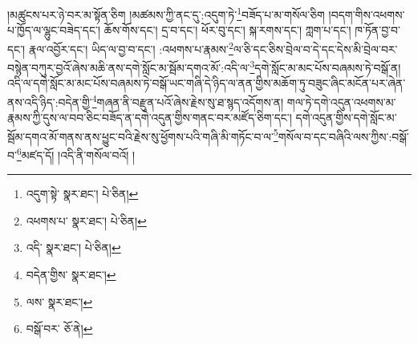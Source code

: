 །མཚུངས་པར་ཉེ་བར་མ་སྟོན་ཅིག །མཚམས་ཀྱི་ནང་དུ་:འདུག་ཏེ་\footnote{འདུག་སྟེ་  སྣར་ཐང་།  པེ་ཅིན། }བཟོད་པ་མ་གསོལ་ཅིག །བདག་གིས་འཕགས་པ་ཁྱོད་ལ་ལྷུང་བཟེད་དང་། ཆོས་གོས་དང་། དྲ་བ་དང་། ཕོར་བུ་དང་། སྐ་རགས་དང་། ཀླག་པ་དང་། ཁ་ཏོན་བྱ་བ་དང་། རྣལ་འབྱོར་དང་། ཡིད་ལ་བྱ་བ་དང་། :འཕགས་པ་རྣམས་\footnote{འཕགས་པ་  སྣར་ཐང་།  པེ་ཅིན། }ལ་ཅི་དང་ཅིས་བྲེལ་བ་དེ་དང་དེས་མི་བྲེལ་བར་བསྙེན་བཀུར་བྱའོ་ཞེས་མཆི་ནས་དགེ་སློང་མ་སྦོམ་དགའ་མོ་:འདི་ལ་\footnote{འདི་  སྣར་ཐང་།  པེ་ཅིན། }དགེ་སློང་མ་མང་པོས་བཞམས་ཏེ་བསྒོ་ན། འདི་ལ་དགེ་སློང་མ་མང་པོས་བཞམས་ཏེ་བསྒོ་ཡང་གཞི་དེ་ཉིད་ལ་ནན་གྱིས་མཆོག་ཏུ་བཟུང་ཞིང་མངོན་པར་ཞེན་ནས་འདི་ཉིད་:བདེན་གྱི་\footnote{བདེན་གྱིས་  སྣར་ཐང་། }གཞན་ནི་བརྫུན་པའོ་ཞེས་རྗེས་སུ་ཐ་སྙད་འདོགས་ན། གལ་ཏེ་དགེ་འདུན་འཕགས་མ་རྣམས་ཀྱི་དུས་ལ་བབ་ཅིང་བཟོད་ན་དགེ་འདུན་གྱིས་གནང་བར་མཛོད་ཅིག་དང་། དགེ་འདུན་གྱིས་དགེ་སློང་མ་སྦོམ་དགའ་མོ་གནས་ནས་ཕྱུང་བའི་རྗེས་སུ་ཕྱོགས་པའི་གཞི་མི་གཏོང་བ་ལ་\footnote{ལས་  སྣར་ཐང་། }གསོལ་བ་དང་བཞིའི་ལས་ཀྱིས་:བསྒོ་བ་\footnote{བསྒོ་བར་  ཅོ་ནེ། }མཛད་དོ། །འདི་ནི་གསོལ་བའོ། །

